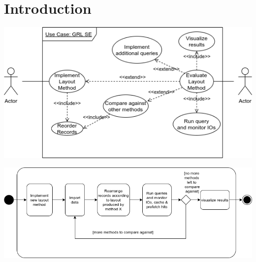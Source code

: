 \section{Introduction}
\begin{center}
    \includegraphics[keepaspectratio,width=.7\textwidth]{img/use_case.png}
\end{center}
		
\begin{center}
 \includegraphics[keepaspectratio, width=1\textwidth, height=\textheight]{img/activity.png}
\end{center} 
